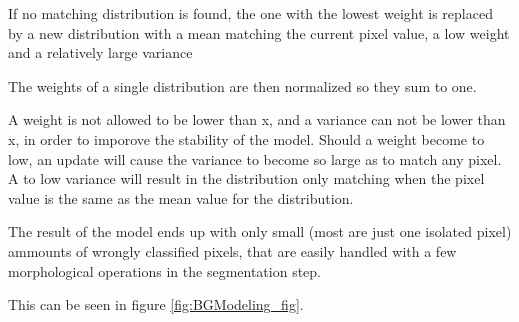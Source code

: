 If no matching distribution is found, the one with the lowest weight is replaced by a new distribution with a mean matching the current pixel value, a low weight and a relatively large variance

The weights of a single distribution are then normalized so they sum to one.

A weight is not allowed to be lower than x, and a variance can not be lower than x, in order to imporove the stability of the model. Should a weight become to low, an update will cause the variance to become so large as to match any pixel. A to low variance will result in the distribution only matching when the pixel value is the same as the mean value for the distribution.

The result of the model ends up with only small (most are just one isolated pixel) ammounts of wrongly classified pixels, that are easily handled with a few morphological operations in the segmentation step.

This can be seen in figure \ref{fig:BGModeling_fig}. %

